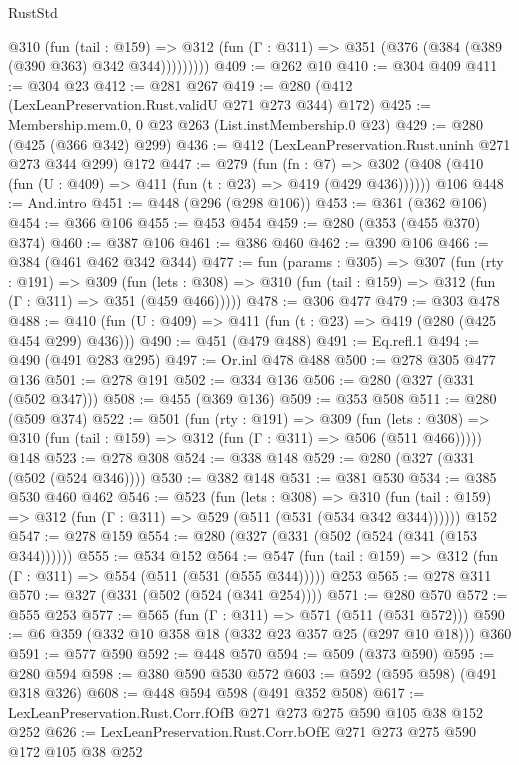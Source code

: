 \begin{lexlean}{RustStd}
\begin{coremodule}
          @310
            (fun (tail : @159) =>
            @312 (fun (Γ : @311) => @351 (@376 (@384 (@389 (@390 @363) @342 @344)))))))))
@409 := @262 @10
@410 := @304 @409
@411 := @304 @23
@412 := @281 @267
@419 := @280 (@412 (LexLeanPreservation.Rust.validU @271 @273 @344) @172)
@425 := Membership.mem.{0, 0} @23 @263 (List.instMembership.{0} @23)
@429 := @280 (@425 (@366 @342) @299)
@436 := @412 (LexLeanPreservation.Rust.uninh @271 @273 @344 @299) @172
@447 := @279
    (fun (fn : @7) =>
    @302 (@408 (@410 (fun (U : @409) => @411 (fun (t : @23) => @419 (@429 @436))))))
    @106
@448 := And.intro
@451 := @448 (@296 (@298 @106))
@453 := @361 (@362 @106)
@454 := @366 @106
@455 := @453 @454
@459 := @280 (@353 (@455 @370) @374)
@460 := @387 @106
@461 := @386 @460
@462 := @390 @106
@466 := @384 (@461 @462 @342 @344)
@477 := fun (params : @305) =>
  @307
    (fun (rty : @191) =>
    @309
      (fun (lets : @308) => @310 (fun (tail : @159) => @312 (fun (Γ : @311) => @351 (@459 @466)))))
@478 := @306 @477
@479 := @303 @478
@488 := @410 (fun (U : @409) => @411 (fun (t : @23) => @419 (@280 (@425 @454 @299) @436)))
@490 := @451 (@479 @488)
@491 := Eq.refl.{1}
@494 := @490 (@491 @283 @295)
@497 := Or.inl @478 @488
@500 := @278 @305 @477 @136
@501 := @278 @191
@502 := @334 @136
@506 := @280 (@327 (@331 (@502 @347)))
@508 := @455 (@369 @136)
@509 := @353 @508
@511 := @280 (@509 @374)
@522 := @501
    (fun (rty : @191) =>
    @309
      (fun (lets : @308) => @310 (fun (tail : @159) => @312 (fun (Γ : @311) => @506 (@511 @466)))))
    @148
@523 := @278 @308
@524 := @338 @148
@529 := @280 (@327 (@331 (@502 (@524 @346))))
@530 := @382 @148
@531 := @381 @530
@534 := @385 @530 @460 @462
@546 := @523
    (fun (lets : @308) =>
    @310 (fun (tail : @159) => @312 (fun (Γ : @311) => @529 (@511 (@531 (@534 @342 @344))))))
    @152
@547 := @278 @159
@554 := @280 (@327 (@331 (@502 (@524 (@341 (@153 @344))))))
@555 := @534 @152
@564 := @547 (fun (tail : @159) => @312 (fun (Γ : @311) => @554 (@511 (@531 (@555 @344))))) @253
@565 := @278 @311
@570 := @327 (@331 (@502 (@524 (@341 @254))))
@571 := @280 @570
@572 := @555 @253
@577 := @565 (fun (Γ : @311) => @571 (@511 (@531 @572)))
@590 := @6 @359 (@332 @10 @358 @18 (@332 @23 @357 @25 (@297 @10 @18))) @360
@591 := @577 @590
@592 := @448 @570
@594 := @509 (@373 @590)
@595 := @280 @594
@598 := @380 @590 @530 @572
@603 := @592 (@595 @598) (@491 @318 @326)
@608 := @448 @594 @598 (@491 @352 @508)
@617 := LexLeanPreservation.Rust.Corr.fOfB @271 @273 @275 @590 @105 @38 @152 @252
@626 := LexLeanPreservation.Rust.Corr.bOfE @271 @273 @275 @590 @172 @105 @38 @252

\end{coremodule}
\end{lexlean}
